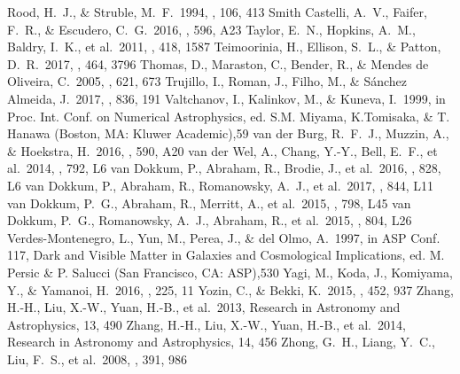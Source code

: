\documentclass[twocolumn,trackchanges]{aastex61}
\begin{document}
\begin{thebibliography}{a}
 Rood, H.~J., \& Struble, M.~F.\ 1994, \pasp, 106, 413 
 Smith Castelli, A.~V., Faifer, F.~R., \& Escudero, C.~G.\ 2016, \aap, 596, A23 
 Taylor, E.~N., Hopkins, A.~M., Baldry, I.~K., et al.\ 2011, \mnras, 418, 1587 
 Teimoorinia, H., Ellison, S.~L., \& Patton, D.~R.\ 2017, \mnras, 464, 3796 
 Thomas, D., Maraston, C., Bender, R., \& Mendes de Oliveira, C.\ 2005, \apj, 621, 673 
 Trujillo, I., Roman, J., Filho, M., \& S{\'a}nchez Almeida, J.\ 2017, \apj, 836, 191 
 Valtchanov, I., Kalinkov, M., \& Kuneva, I.\ 1999, in Proc. Int. Conf. on Numerical Astrophysics, ed. S.M. Miyama, K.Tomisaka, \& T. Hanawa (Boston, MA: Kluwer Academic),59 
 van der Burg, R.~F.~J., Muzzin, A., \& Hoekstra, H.\ 2016, \aap, 590, A20
 van der Wel, A., Chang, Y.-Y., Bell, E.~F., et al.\ 2014, \apjl, 792, L6 
 van Dokkum, P., Abraham, R., Brodie, J., et al.\ 2016, \apjl, 828, L6 
 van Dokkum, P., Abraham, R., Romanowsky, A.~J., et al.\ 2017, \apjl, 844, L11 
 van Dokkum, P.~G., Abraham, R., Merritt, A., et al.\ 2015, \apjl, 798, L45
 van Dokkum, P.~G., Romanowsky, A.~J., Abraham, R., et al.\ 2015, \apjl, 804, L26 
 Verdes-Montenegro, L., Yun, M., Perea, J., \& del Olmo, A.\ 1997, in ASP Conf. 117, Dark and Visible Matter in Galaxies and Cosmological Implications, ed. M. Persic \& P. Salucci (San Francisco, CA: ASP),530 
 Yagi, M., Koda, J., Komiyama, Y., \& Yamanoi, H.\ 2016, \apjs, 225, 11 
 Yozin, C., \& Bekki, K.\ 2015, \mnras, 452, 937 
 Zhang, H.-H., Liu, X.-W., Yuan, H.-B., et al.\ 2013, Research in Astronomy and Astrophysics, 13, 490 
 Zhang, H.-H., Liu, X.-W., Yuan, H.-B., et al.\ 2014, Research in Astronomy and Astrophysics, 14, 456
 Zhong, G.~H., Liang, Y.~C., Liu, F.~S., et al.\ 2008, \mnras, 391, 986 
\end{thebibliography}
\end{document}
